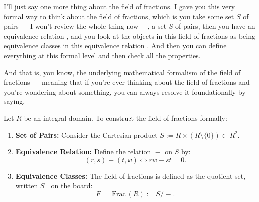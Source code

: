 \begin{speech}[00:01:00 - 00:01:46]
I'll just say one more thing about the field of fractions. I gave you this very formal way to think about the field of fractions, which is you take some set $S$ of pairs  --- I won't review the whole thing now ---, a set $S$ of pairs, then you have an equivalence relation , and you look at the objects in this field of fractions as being equivalence classes in this equivalence relation . And then you can define everything at this formal level and then check all the properties.

And that is, you know, the underlying mathematical formalism of the field of fractions --- meaning that if you're ever thinking about the field of fractions and you're wondering about something, you can always resolve it foundationally by saying, 
\end{speech}

\begin{content}

Let $R$ be an integral domain. To construct the field of fractions formally:
\begin{enumerate}[label=\textbf{(\arabic*)}]
    \setcounter{enumi}{0} \item \textbf{Set of Pairs:} Consider the Cartesian product $S := R \times (R \setminus \{0\}) \subset R^2$.
    \setcounter{enumi}{1} \item \textbf{Equivalence Relation:} Define the relation $\equiv$ on $S$ by:
    \[
    (r, s) \equiv (t, w) \iff rw - st = 0.
    \]
    \setcounter{enumi}{2} \item \textbf{Equivalence Classes:} The field of fractions is defined as the quotient set, written $S_{\equiv}$ on the board:
    \[
    F = \operatorname{Frac}(R) := S / {\equiv}.
    \]
\end{enumerate}
\end{content}


